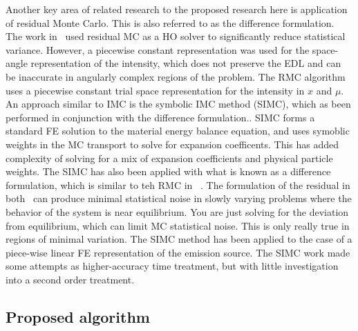 \documentclass[11pt]{article}
\begin{document}
Another key area of related research to the proposed research here is application of
residual Monte Carlo. This is also referred to as the difference formulation.
  The work in~\cite{rmc} used residual MC as a HO solver to significantly reduce
statistical variance.  However, a piecewise constant representation was used for the
space-angle representation of the intensity, which
does not preserve the EDL and can be inaccurate in angularly complex regions of the
problem. The RMC
algorithm  uses a piecewise constant trial space representation for the intensity in
$x$ and $\mu$.  An approach similar to IMC is the symbolic IMC method (SIMC), which
as been performed in conjunction with the difference formulation..  SIMC forms a
standard FE solution to the material energy balance equation, and uses symoblic
weights in the MC transport to solve for expansion coefficents.  
This has added complexity of solving for a mix of expansion coefficients and physical
particle weights.  The SIMC has also been applied with what is known as a difference
formulation, which is similar to teh RMC in ~\cite{rmc}.
 The formulation of the residual in both~\cite{rmc,simc} can produce minimal
statistical noise in slowly varying problems where the behavior of the system is near
equilibrium.   You are just solving for
the deviation from equilibrium, which can limit MC statistical noise.  This is only
really true in regions of minimal variation. The SIMC method has been applied to the
case of a piece-wise linear FE representation of the emission source. The SIMC work
made some attempts as higher-accuracy time treatment, but with little investigation
into a second order treatment.

\subsection{Proposed algorithm}
\end{document}
